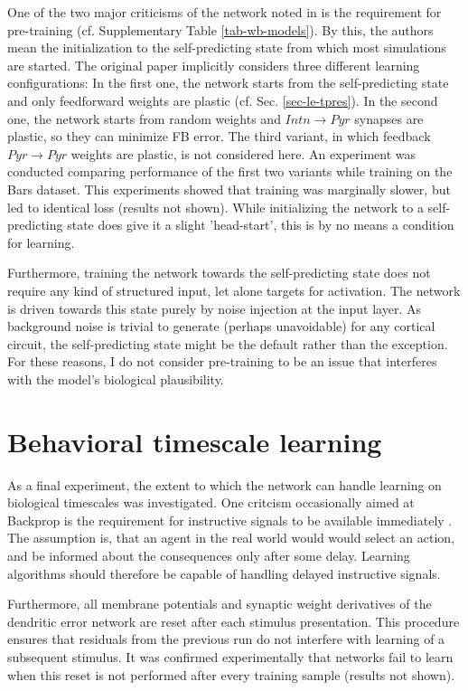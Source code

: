 One of the two major criticisms of the network noted in \citep{whittington2019theories} is the requirement for
pre-training (cf. Supplementary Table \ref{tab-wb-models}). By this, the authors mean the initialization to the
self-predicting state from which most simulations are started. The original paper implicitly considers three different
learning configurations: In the first one, the network starts from the self-predicting state and only feedforward
weights are plastic (cf. Sec. \ref{sec-le-tpres}). In the second one, the network starts from random weights and $Intn
    \rightarrow Pyr$ synapses are plastic, so they can minimize FB error. The third variant, in which feedback $Pyr
    \rightarrow Pyr$ weights are plastic, is not considered here. An experiment was conducted comparing performance of the
first two variants while training on the Bars dataset. This experiments showed that training was marginally slower, but
led to identical loss (results not shown). While initializing the network to a self-predicting state does give it a
slight 'head-start', this is by no means a condition for learning.

Furthermore, training the network towards the self-predicting state does not require any kind of structured input, let
alone targets for activation. The network is driven towards this state purely by noise injection at the input layer. As
background noise is trivial to generate (perhaps unavoidable) for any cortical circuit, the self-predicting state might
be the default rather than the exception. For these reasons, I do not consider pre-training to be an issue that
interferes with the model's biological plausibility.


\section{Behavioral timescale learning}

As a final experiment, the extent to which the network can handle learning on biological timescales was investigated.
One critcism occasionally aimed at Backprop is the requirement for instructive signals to be available immediately
\citep{Bartunov2018}. The assumption is, that an agent in the real world would would select an action, and be informed
about the consequences only after some delay. Learning algorithms should therefore be capable of handling delayed
instructive signals.

Furthermore, all membrane potentials and synaptic weight derivatives of the dendritic error network are reset after each
stimulus presentation. This procedure ensures that residuals from the previous run do not interfere with learning of a
subsequent stimulus. It was confirmed experimentally that networks fail to learn when this reset is not performed after
every training sample (results not shown).

